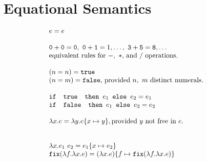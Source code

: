 \section{Equational Semantics}
\[
\begin{array}{lr}
e = e \\ \\
\texttt{0} + \texttt{0} = \texttt{0}, \ \texttt{0} + \texttt{1} = 1, \ldots, \ \texttt{3} + \texttt{5} = \texttt{8}, \ldots  \\
\text{equivalent rules for } -, \ * \text{, and } /\text{ operations.}
\\ \\
(n =n) = \texttt{true} \\ (n=m) = \texttt{false}\text{, provided } n, \ m \text{ distinct numerals.}\\ \\ 
\ifelse{\texttt{ true }}{e_1}{e_2} = e_1 \\
\ifelse{\texttt{ false }}{e_1}{e_2} = e_2 \\ \\ 
\lambda x.e = \lambda y.e\{x \mapsto y \}, \text{provided } y \text{ not free in } e. \\ \\ \\
\lambda x.e_1 \ e_2 = e_1\{x \mapsto e_2\} \\
\texttt{fix}(\lambda f. \lambda x.e) = (\lambda x.e)\{f \mapsto \texttt{fix}(\lambda f.\lambda x.e)\}
\end{array}
\]

